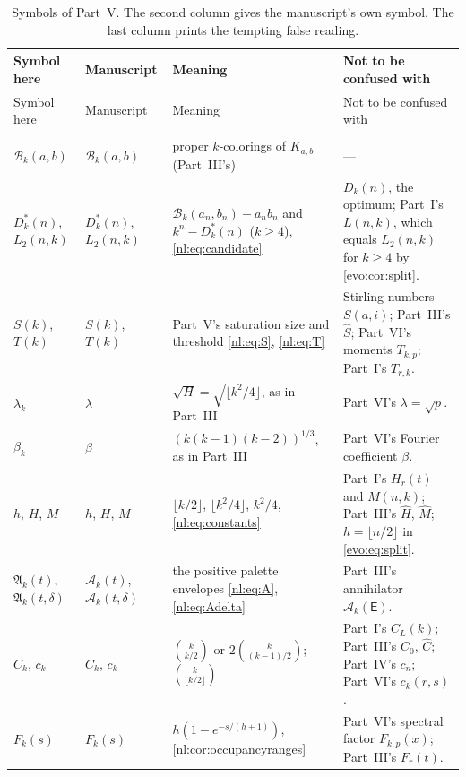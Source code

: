 \documentclass[11pt,a4paper]{article}
\numberwithin{equation}{section}
\theoremstyle{definition}
\theoremstyle{remark}
\newcommand{\Bip}{\mathcal B}
\newcommand{\nlenv}{\mathfrak A}
\begin{document}
{\small
\begin{longtable}{>{\raggedright}p{.15\linewidth}>{\raggedright}p{.17\linewidth}>{\raggedright}p{.30\linewidth}>{\raggedright\arraybackslash}p{.26\linewidth}}
\caption{Symbols of Part~V. The second column gives the manuscript's own
symbol. The last column prints the tempting false reading.}\label{nl:tab:notation}\\
\toprule
Symbol here & Manuscript & Meaning & Not to be confused with\\
\midrule\endfirsthead
\toprule
Symbol here & Manuscript & Meaning & Not to be confused with\\
\midrule\endhead
\midrule\multicolumn{4}{r}{\footnotesize Continued on next page}\\\endfoot
\bottomrule\endlastfoot
$\Bip_k(a,b)$ & $\mathcal B_k(a,b)$ & proper $k$-colorings of $K_{a,b}$ (Part~III's) & ---\\
$D^*_k(n)$, $L_2(n,k)$ & $D_k^*(n)$, $L_2(n,k)$ & $\Bip_k(a_n,b_n)-a_nb_n$ and $k^n-D^*_k(n)$ ($k\ge4$), \eqref{nl:eq:candidate} & $D_k(n)$, the optimum; Part~I's $L(n,k)$, which equals $L_2(n,k)$ for $k\ge4$ by \cref{evo:cor:split}.\\
$S(k)$, $T(k)$ & $S(k)$, $T(k)$ & Part~V's saturation size and threshold \eqref{nl:eq:S}, \eqref{nl:eq:T} & Stirling numbers $S(a,i)$; Part~III's $\hat S$; Part~VI's moments $T_{k,p}$; Part~I's $T_{r,k}$.\\
$\lambda_k$ & $\lambda$ & $\sqrt H=\sqrt{\lfloor k^2/4\rfloor}$, as in Part~III & Part~VI's $\lambda=\sqrt p$.\\
$\beta_k$ & $\beta$ & $(k(k-1)(k-2))^{1/3}$, as in Part~III & Part~VI's Fourier coefficient $\beta$.\\
$h$, $H$, $M$ & $h$, $H$, $M$ & $\lfloor k/2\rfloor$, $\lfloor k^2/4\rfloor$, $k^2/4$, \eqref{nl:eq:constants} & Part~I's $H_r(t)$ and $M(n,k)$; Part~III's $\hat H$, $\hat M$; $h=\lfloor n/2\rfloor$ in \eqref{evo:eq:split}.\\
$\nlenv_k(t)$, $\nlenv_k(t,\delta)$ & $\mathcal A_k(t)$, $\mathcal A_k(t,\delta)$ & the positive palette envelopes \eqref{nl:eq:A}, \eqref{nl:eq:Adelta} & Part~III's annihilator $\mathcal A_k(\mathsf E)$.\\
$C_k$, $c_k$ & $C_k$, $c_k$ & $\binom{k}{k/2}$ or $2\binom{k}{(k-1)/2}$; $\binom{k}{\lfloor k/2\rfloor}$ & Part~I's $C_L(k)$; Part~III's $C_0$, $\hat C$; Part~IV's $c_n$; Part~VI's $c_k(r,s)$.\\
$F_k(s)$ & $F_k(s)$ & $h(1-e^{-s/(h+1)})$, \cref{nl:cor:occupancyranges} & Part~VI's spectral factor $F_{k,p}(x)$; Part~III's $F_r(t)$.\\

\end{longtable}}
\end{document}
